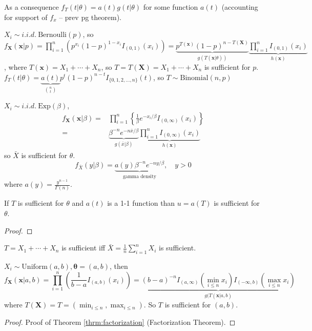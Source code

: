 \documentclass[english, 11pt]{article}
\begin{document}
As a consequence $f_T(t|\theta)=a(t)g(t|\theta)$ for some function $a(t)$ (accounting for support of $f_x$ -- prev pg theorem).

\begin{exmp}
$X_i\sim i.i.d.~\text{Bernoulli}(p)$, so $f_{\bm{X}}(\bm{x}|p)=\prod_{i=1}^n\left(p^{x_i}(1-p)^{1-x_i}I_{(0,1)}(x_i)\right)=\underbrace{p^{T(\bm{x})}(1-p)^{n-T(\bm{X})}}_{g(T(\bm{x}|\theta))}\underbrace{\prod_{i=1}^nI_{(0, 1)}(x_i)}_{h(\bm{x})}$, where $T(\bm{x})=X_1+\cdots+X_n$, so $T=T(\bm{X})=X_1+\cdots+X_n$ is sufficient for $p$. $f_T(t|\theta)=\underbrace{a(t)}_{\binom{n}{t}}p^t(1-p)^{n-t}I_{\{0, 1, 2, \dots, n\}}(t)$, so $T\sim\text{Binomial}(n,p)$
\end{exmp}


\begin{exmp}
$X_i\sim i.i.d.~ \text{Exp}(\beta)$, 
$$
\begin{aligned}
f_{\bm{X}}(\bm{x}|\beta)=&\prod_{i=1}^n\left\{\frac{1}{\beta}e^{-x_i/\beta}I_{(0, \infty)}(x_i)\right\}\\
=&\underbrace{\beta^{-n}e^{-n\bar{x}/\beta}}_{g(\bar{x}|\beta)}\underbrace{\prod_{i=1}^nI_{(0, \infty)}(x_i)}_{h(\bm{x})}
\end{aligned}
$$
so $\bar{X}$ is sufficient for $\theta$.
$$
f_{\bar{X}}(y|\beta)=\underbrace{a(y)\beta^{-n}e^{-ny/\beta}}_{\text{gamma density}}, \quad y>0
$$
where $a(y)=\frac{y^{n-1}}{\Gamma(n)}$.
\end{exmp}

\begin{cor}
If $T$ is sufficient for $\theta$ and $a(t)$ is a 1-1 function than $u=a(T)$ is sufficient for $\theta$.
\end{cor}
\begin{proof}
\end{proof}
\begin{exmp}
$T=X_1+\cdots+X_n$ is sufficient iff $\bar{X}=\frac{1}{n}\sum_{i=1}^nX_i$ is sufficient.
\end{exmp}
\begin{exmp}\label{exmp:210}
$X_i\sim \text{Uniform}(a, b), \bm{\theta}=(a, b)$, then
$$
f_{\bm{X}}(\bm{x}|a, b)=\prod_{i=1}^n\left(\frac{1}{b-a}I_{(a, b)}(x_i)\right)=\underbrace{(b-a)^{-n}I_{(a, \infty)}(\min_{i\leqslant n}x_i)I_{(-\infty, b)}(\max_{i\leqslant n}x_i)}_{g(T(\bm{x}|a, b)}
$$
where $T(\bm{X})=T=(\min_{i\leqslant n}, \max_{i\leqslant n})$. So $T$ is sufficient for $(a, b)$.
\end{exmp}
\begin{proof}
Proof of Theorem \ref{thrm:factorization} (Factorization Theorem).
\end{proof}
\end{document}
